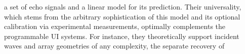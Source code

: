 a set of
echo signals and
a linear model for
its prediction.
Their universality, which stems from
the arbitrary sophistication of
this model and
its optional calibration via
experimental measurements, optimally complements
the programmable \ac{UI} systems.
For instance,
they theoretically support
incident waves and
array geometries of
any complexity,
the separate recovery of
